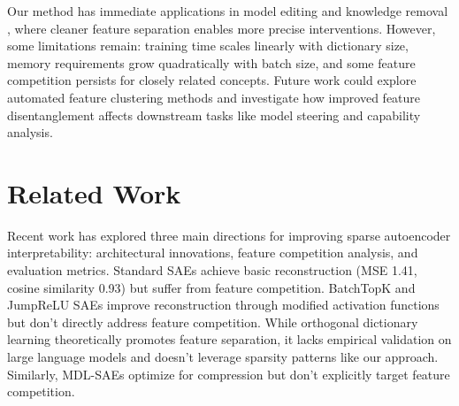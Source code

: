 \documentclass{article} %
\begin{document}
Our method has immediate applications in model editing \cite{marksSparseFeatureCircuits2024} and knowledge removal \cite{farrellApplyingSparseAutoencoders2024}, where cleaner feature separation enables more precise interventions. However, some limitations remain: training time scales linearly with dictionary size, memory requirements grow quadratically with batch size, and some feature competition persists for closely related concepts. Future work could explore automated feature clustering methods and investigate how improved feature disentanglement affects downstream tasks like model steering and capability analysis.

\section{Related Work}
\label{sec:related}




Recent work has explored three main directions for improving sparse autoencoder interpretability: architectural innovations, feature competition analysis, and evaluation metrics. Standard SAEs \cite{gaoScalingEvaluatingSparse} achieve basic reconstruction (MSE 1.41, cosine similarity 0.93) but suffer from feature competition. BatchTopK \cite{bussmannBatchTopKSparseAutoencoders2024} and JumpReLU \cite{rajamanoharanJumpingAheadImproving2024} SAEs improve reconstruction through modified activation functions but don't directly address feature competition. While orthogonal dictionary learning \cite{Liu2021ExactSO} theoretically promotes feature separation, it lacks empirical validation on large language models and doesn't leverage sparsity patterns like our approach. Similarly, MDL-SAEs \cite{Ayonrinde2024InterpretabilityAC} optimize for compression but don't explicitly target feature competition.
\end{document}
